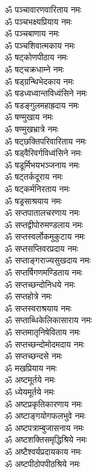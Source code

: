 \begin{multicols}{2}
\begin{flushleft}
ॐ पञ्चावारणवारिताय नमः\\
ॐ पञ्चभक्ष्यप्रियाय नमः\\
ॐ पञ्चबाणाय नमः\\
ॐ पञ्चशिवात्मकाय नमः\hfill{}\\
ॐ षट्कोणपीठाय नमः\\
ॐ षट्चक्रधाम्ने नमः\\
ॐ षड्ग्रन्थिभेदकाय नमः\\
ॐ षडध्वध्वान्तविध्वंसिने नमः\\
ॐ षडङ्गुलमहाह्रदाय नमः\\
ॐ षण्मुखाय नमः\\
ॐ षण्मुखभ्रात्रे नमः\\
ॐ षट्छक्तिपरिवारिताय नमः\\
ॐ षड्वैरिवर्गविध्वंसिने नमः\\
ॐ षडूर्मिभयभञ्जनाय नमः\hfill{}\\
ॐ षट्तर्कदूराय नमः\\
ॐ षट्कर्मनिरताय नमः\\
ॐ षड्रसाश्रयाय नमः\\
ॐ सप्तपातालचरणाय नमः\\
ॐ सप्तद्वीपोरुमण्डलाय नमः\\
ॐ सप्तस्वर्लोकमुकुटाय नमः\\
ॐ सप्तसप्तिवरप्रदाय नमः\\
ॐ सप्ताङ्गराज्यसुखदाय नमः\\
ॐ सप्तर्षिगणमण्डिताय नमः\\
ॐ सप्तच्छन्दोनिधये नमः\hfill{}\\
ॐ सप्तहोत्रे नमः\\
ॐ सप्तस्वराश्रयाय नमः\\
ॐ सप्ताब्धिकेलिकासाराय नमः\\
ॐ सप्तमातृनिषेविताय नमः\\
ॐ सप्तच्छन्दोमोदमदाय नमः\\
ॐ सप्तच्छन्दसे नमः\\
ॐ मखप्रियाय नमः\\
ॐ अष्टमूर्तये नमः\\
ॐ ध्येयमूर्तये नमः\\
ॐ अष्टप्रकृतिकारणाय नमः\hfill{}\\
ॐ अष्टाङ्गयोगफलभुवे नमः\\
ॐ अष्टपत्राम्बुजासनाय नमः\\
ॐ अष्टशक्तिसमृद्धिश्रिये नमः\\
ॐ अष्टैश्वर्यप्रदायकाय नमः\\
ॐ अष्टपीठोपपीठश्रिये नमः\\

\end{flushleft}
\end{multicols}
